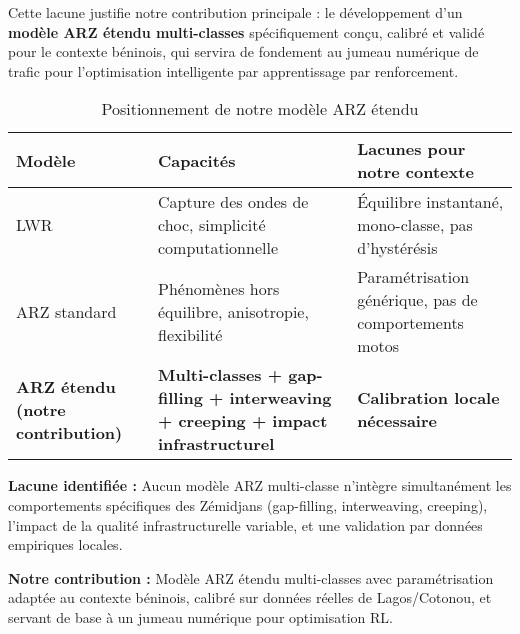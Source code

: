 Cette lacune justifie notre contribution principale : le développement d'un \textbf{modèle ARZ étendu multi-classes} spécifiquement conçu, calibré et validé pour le contexte béninois, qui servira de fondement au jumeau numérique de trafic pour l'optimisation intelligente par apprentissage par renforcement.

\begin{table}[htbp]
    \centering
    \caption{Positionnement de notre modèle ARZ étendu}
    \label{tab:modeles_comparaison}
    \begin{tabular}{|p{3cm}|p{4.5cm}|p{4.5cm}|}
        \hline
        \textbf{Modèle}                          & \textbf{Capacités}                                                                      & \textbf{Lacunes pour notre contexte}                  \\
        \hline
        LWR                                      & Capture des ondes de choc, simplicité computationnelle                                  & Équilibre instantané, mono-classe, pas d'hystérésis   \\
        \hline
        ARZ standard                             & Phénomènes hors équilibre, anisotropie, flexibilité                                     & Paramétrisation générique, pas de comportements motos \\
        \hline
        \textbf{ARZ étendu (notre contribution)} & \textbf{Multi-classes + gap-filling + interweaving + creeping + impact infrastructurel} & \textbf{Calibration locale nécessaire}                \\
        \hline
    \end{tabular}
\end{table}

\begin{synthesisbox}
    \textbf{Lacune identifiée :} Aucun modèle ARZ multi-classe n'intègre simultanément les comportements spécifiques des Zémidjans (gap-filling, interweaving, creeping), l'impact de la qualité infrastructurelle variable, et une validation par données empiriques locales.

    \vspace{0.3cm}

    \textbf{Notre contribution :} Modèle ARZ étendu multi-classes avec paramétrisation adaptée au contexte béninois, calibré sur données réelles de Lagos/Cotonou, et servant de base à un jumeau numérique pour optimisation RL.
\end{synthesisbox}
